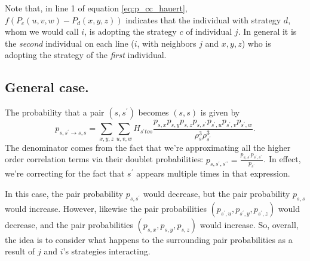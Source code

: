 \documentclass[13pt]{amsart}
\begin{document}
Note that, in line 1 of equation \ref{eq:p_cc_hauert}, $f(P_c(u, v, w) - P_d(x,y,z))$ indicates that the individual with strategy $d$, whom we would call $i$, is adopting the strategy $c$ of individual $j$.
In general it is the \emph{second} individual on each line ($i$, with neighbors $j$ and $x, y, z$) who is adopting the strategy of the \emph{first} individual.

\subsection*{General case.}

The probability that a pair $(s, s^\prime)$ becomes $(s, s)$ is given by
\begin{equation}
  p_{s,s^\prime \to s, s} = \sum_{x,y,z} \sum_{u,v,w} H_{s^\prime to s} \frac{p_{s,x}p_{s,y}p_{s,z} p_{s,s^\prime} p_{s^\prime,u} p_{s^\prime,v} p_{s^\prime,w}}{\rho_s^3 \rho_{s^\prime}^3}.
\end{equation}
The denominator comes from the fact that we're approximating all the higher order correlation terms via their doublet probabilities: $p_{s,s^\prime,s^{\prime \prime}} = \frac{p_{s,s^\prime}p_{s^\prime, s^{\prime \prime}}}{p_{s^\prime}}$.
In effect, we're correcting for the fact that $s^\prime$ appears multiple times in that expression.

In this case, the pair probability $p_{s,s^\prime}$ would decrease, but the pair probability $p_{s,s}$ would increase.
However, likewise the pair probabilities $(p_{s^\prime,u}, p_{s^\prime,y}, p_{s^\prime,z})$ would decrease, and the pair probabilities $(p_{s,x}, p_{s,y}, p_{s,z})$ would increase.
So, overall, the idea is to consider what happens to the surrounding pair probabilities as a result of $j$ and $i$'s strategies interacting.
\end{document}
